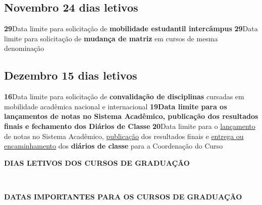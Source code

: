 \documentclass[thesis]{hmcposter}
\begin{document}
\begin{poster}
\subsection{Novembro \hfill 24 dias letivos}\textbf{29}\qquad Data limite para solicitação de \textbf{mobilidade estudantil intercâmpus} \newline \null\textbf{29}\qquad Data limite para solicitação de \textbf{mudança de matriz} em cursos de mesma denominação \newline \null\subsection{Dezembro \hfill 15 dias letivos}\textbf{16}\qquad Data limite para solicitação de \textbf{convalidação de disciplinas} cursadas em mobilidade acadêmica nacional e internacional \newline \null\textbf{19}\qquad \textbf{Data limite para os lançamentos de notas no Sistema Acadêmico, publicação dos resultados finais e fechamento dos Diários de Classe} \newline \null\textbf{20}\qquad Data limite para o \underline{lançamento} de notas no Sistema Acadêmico, \underline{publicação} dos resultados finais e \underline{entrega ou encaminhamento} dos \textbf{diários de classe} para a Coordenação do Curso \newline \null\newpage
~
\vfill
\begin{center}
\large \textbf{DIAS LETIVOS DOS CURSOS DE GRADUAÇÃO}
\newline
\null
\newline
\begin{table}
\centering
{}
\end{table}
\null
\end{center}
\vfill
\null
\columnbreak
~
\vfill
\begin{center}
\large \textbf{DATAS IMPORTANTES PARA OS CURSOS DE GRADUAÇÃO}

\end{center}
\end{poster}
\end{document}
